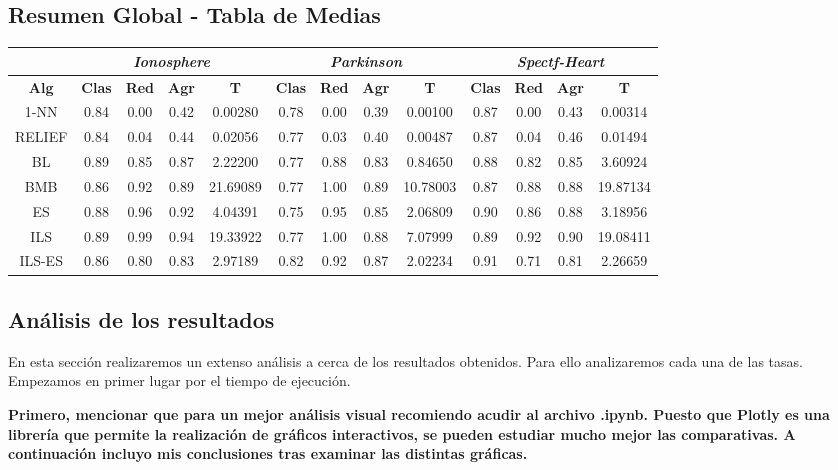 \documentclass[10pt, a4paper]{article}
\theoremstyle{theorem-style}
\theoremstyle{theorem-style}
\theoremstyle{theorem2-style}
\theoremstyle{definition-style}
\theoremstyle{remark-style}
\theoremstyle{example-style}
\theoremstyle{definition-style}
\theoremstyle{remark-style}
\theoremstyle{remark-style}
\begin{document}
\subsection{Resumen Global - Tabla de Medias}

\begin{table}[h]
\begin{tabular}{ccccc|cccc|cccc}
\centering
 & \multicolumn{4}{c}{\textit{Ionosphere}} & \multicolumn{4}{c}{\textit{Parkinson}} & \multicolumn{4}{c}{\textit{Spectf-Heart}} \\ \hline
\textbf{Alg} & \textbf{Clas} & \textbf{Red} & \textbf{Agr} & \textbf{T} & \textbf{Clas} & \textbf{Red} & \textbf{Agr} & \textbf{T} & \textbf{Clas} & \textbf{Red} & \textbf{Agr} & \textbf{T} \\ \hline
1-NN &	0.84 & 0.00 & 0.42 & 0.00280	& 0.78 & 0.00 & 0.39 & 0.00100	& 0.87 & 0.00 & 0.43 & 0.00314 \\
RELIEF &  0.84 & 0.04 & 0.44 & 0.02056 & 	0.77 & 0.03 & 0.40 & 0.00487 & 0.87 & 0.04 & 0.46 & 0.01494\\
\hline
BL & 0.89 & 0.85 & 0.87 & 2.22200	&0.77 & 0.88 & 0.83 & 0.84650	&	0.88 & 0.82 & 0.85 & 3.60924\\
BMB & 0.86 & 0.92 & 0.89 & 21.69089	& 0.77 & 1.00 & 0.89 & 10.78003	&	0.87 & 0.88 & 0.88 & 19.87134\\
ES & 0.88 & 0.96 & 0.92 & 4.04391	& 0.75 & 0.95 & 0.85 & 2.06809	&	0.90 & 0.86 & 0.88 & 3.18956\\
ILS & 0.89 & 0.99 & 0.94 & 19.33922&	0.77 & 1.00 & 0.88 & 7.07999	&	0.89 & 0.92 & 0.90 & 19.08411\\
ILS-ES & 0.86 & 0.80 & 0.83 & 2.97189	&0.82 & 0.92 & 0.87 & 2.02234	&	0.91 & 0.71 & 0.81 & 2.26659
\end{tabular}
\end{table}

\subsection{Análisis de los resultados}

En esta sección realizaremos un extenso análisis a cerca de los resultados obtenidos. Para ello analizaremos cada una de las tasas. Empezamos en primer lugar por el tiempo de ejecución. 

\begin{tcolorbox}
\textbf{Primero, mencionar que para un mejor análisis visual recomiendo acudir al archivo .ipynb. Puesto que Plotly es una librería que permite la realización de gráficos interactivos, se pueden estudiar mucho mejor las comparativas. A continuación incluyo mis conclusiones tras examinar las distintas gráficas.}
\end{tcolorbox}
\end{document}
